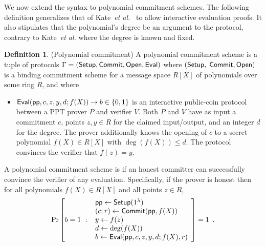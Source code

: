 \documentclass{article}
\theoremstyle{definition}
\newtheorem{definition}{Definition}
\begin{document}
We now extend the syntax to polynomial commitment schemes. The following definition generalizes that of Kate~\emph{et al.}~\cite{AC:KatZavGol10} to allow interactive evaluation proofs. It also stipulates that the polynomial's degree be an argument to the protocol, contrary to Kate~\emph{et al.} where the degree is known and fixed.

\begin{definition} (Polynomial commitment) 
A polynomial commitment scheme is a tuple of protocols $\Gamma = (\textsf{{Setup}}, \textsf{{Commit}}, \textsf{{Open}}, \textsf{{Eval}})$ where $(\textsf{{Setup}},$ $\textsf{{Commit}}, \textsf{{Open}})$ is a binding commitment scheme for a message space $R[X]$ of polynomials over some ring $R$, and where
\begin{itemize}
    \item $\textsf{{Eval}}(\textsf{pp}, c, z, y, d; f(X)) \rightarrow b \in \{0, 1\}$ is an interactive public-coin protocol between a PPT prover $P$ and verifier $V$. Both $P$ and $V$ have as input a commitment $c$, points $z, y \in R$ for the claimed input/output, and an integer $d$ for the degree. The prover additionally knows the opening of $c$ to a secret polynomial $f(X) \in R[X]$ with $\deg(f(X)) \leq d$. The protocol convinces the verifier that $f(z) = y$.
\end{itemize}

A polynomial commitment scheme is  if an honest committer can successfully convince the verifier of any evaluation. Specifically, if the prover is honest then for all polynomials $f(X) \in R[X]$ and all points $z \in R$,
\[
    \Pr\left[b = 1 \ : \ \begin{array}{l}
        \textsf{pp} \gets \textsf{{Setup}}(1^\lambda) \\
        (c; r) \gets \textsf{{Commit}}(\textsf{pp}, f(X)) \\
        y \gets f(z) \\
        d \gets \deg(f(X)) \\
        b \gets \textsf{{Eval}}(\textsf{pp}, c, z, y, d; f(X), r) \\
    \end{array} \right] = 1 \enspace .
\]


\end{definition}
\end{document}
